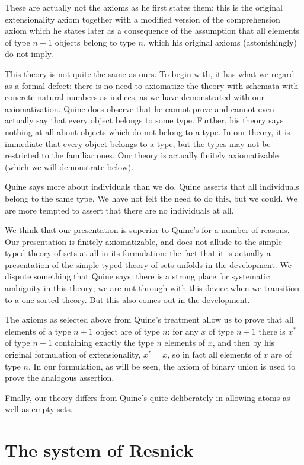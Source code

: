\documentclass[12pt]{article}
\begin{document}
These are actually not the axioms as he first states them:  this is the original extensionality axiom together with a modified version of the comprehension axiom which he states later as a consequence of the assumption that all elements of type $n+1$ objects belong to type $n$, which his original axioms (astonishingly) do not imply.

This theory is not quite the same as ours.  To begin with, it has what we regard as a formal defect:  there is no need to axiomatize the theory with schemata with concrete natural numbers as indices, as we have demonstrated with our axiomatization.  Quine does observe that he cannot prove and cannot even actually say that every object belongs to some type.  Further, his theory says nothing at all about objects which do not belong to a type. In our theory, it is immediate that every object belongs to a type, but the types may not be restricted to the familiar ones.  Our theory is actually finitely axiomatizable (which we will demonstrate below).

Quine says more about individuals than we do.  Quine asserts that all individuals belong to the same type.  We have not felt the need to do this, but we could.  We are more tempted to assert that there are no individuals at all.

We think that our presentation is superior to Quine's for a number of reasons.  Our presentation is finitely axiomatizable, and does not allude to the simple typed theory of sets at all in its formulation:  the fact that it is actually a presentation of the simple typed theory of sets unfolds in the development.  We dispute something that Quine says:  there is a strong place for systematic ambiguity in this theory; we are not through with this device when we transition to a one-sorted theory.  But this also comes out in the development.

The axioms as selected above from Quine's treatment allow us to prove that
all elements of a type $n+1$ object are of type $n$:  for any $x$ of type $n+1$ there
is $x^*$ of type $n+1$ containing exactly the type $n$ elements of $x$, and then by his original formulation of extensionality, $x^*=x$, so in fact all elements of $x$ are of type $n$.  In our formulation, as will be seen, the axiom of binary union is used to prove the analogous assertion.

Finally, our theory differs from Quine's quite deliberately in allowing atoms as well as empty sets.

\section{The system of Resnick}
\end{document}
